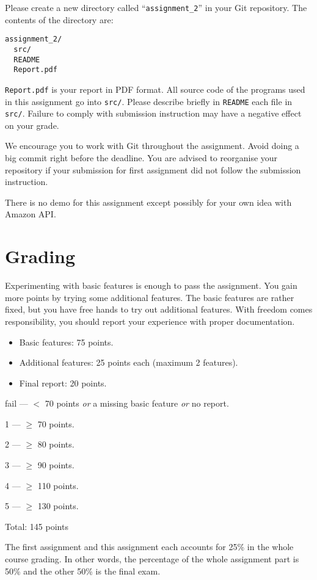 \documentclass[12pt, a4paper]{article}
\begin{document}
Please create a new directory called ``\texttt{assignment\_2}'' in your Git repository.
The contents of the directory are:
\begin{verbatim}
assignment_2/
  src/
  README
  Report.pdf
\end{verbatim}

\texttt{Report.pdf} is your report in PDF format.
All source code of the programs used in this assignment go into \texttt{src/}.
Please describe briefly in \texttt{README} each file in \texttt{src/}.
Failure to comply with submission instruction may have a negative effect on your grade.

We encourage you to work with Git throughout the assignment.
Avoid doing a big commit right before the deadline.
You are advised to reorganise your repository if your submission for first assignment did not follow the submission instruction.

There is no demo for this assignment except possibly for your own idea with Amazon API.

\section{Grading}
Experimenting with basic features is enough to pass the assignment.
You gain more points by trying some additional features.
The basic features are rather fixed, but you have free hands to try out additional features.
With freedom comes responsibility, you should report your experience with proper documentation.

\vskip 20pt

\begin{itemize}
\item Basic features: 75 points.
\item Additional features: 25 points each (maximum 2 features).
\item Final report: 20 points.
\end{itemize}

\vskip 10pt

fail --- $<$ 70 points \emph{or} a missing basic feature \emph{or} no report.

1 --- $\ge$ 70 points.

2 --- $\ge$ 80 points.

3 --- $\ge$ 90 points.

4 --- $\ge$ 110 points.

5 --- $\ge$ 130 points.

\vskip 20pt

Total: 145 points

\vskip 20pt

The first assignment and this assignment each accounts for 25\% in the whole course grading.
In other words, the percentage of the whole assignment part is 50\% and the other 50\% is the final exam.
\end{document}
